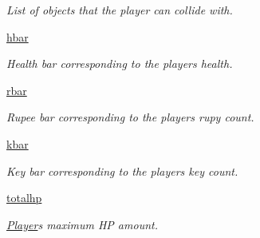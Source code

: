 \begin{DoxyCompactItemize}
\begin{DoxyCompactList}\small\item\em List of objects that the player can collide with. \end{DoxyCompactList}\item 
\mbox{\label{classactor_1_1player_1_1_player_a8678a9b7bbec1f8a257498fdd66597fb}} 
\hyperlink{classactor_1_1player_1_1_player_a8678a9b7bbec1f8a257498fdd66597fb}{hbar}
\begin{DoxyCompactList}\small\item\em Health bar corresponding to the player\textquotesingle{}s health. \end{DoxyCompactList}\item 
\mbox{\label{classactor_1_1player_1_1_player_a31f4d4cef26800b302bb683ab0008851}} 
\hyperlink{classactor_1_1player_1_1_player_a31f4d4cef26800b302bb683ab0008851}{rbar}
\begin{DoxyCompactList}\small\item\em Rupee bar corresponding to the player\textquotesingle{}s rupy count. \end{DoxyCompactList}\item 
\mbox{\label{classactor_1_1player_1_1_player_afa08d9f1172947ccc9eb5e5bae3a7a8e}} 
\hyperlink{classactor_1_1player_1_1_player_afa08d9f1172947ccc9eb5e5bae3a7a8e}{kbar}
\begin{DoxyCompactList}\small\item\em Key bar corresponding to the player\textquotesingle{}s key count. \end{DoxyCompactList}\item 
\mbox{\label{classactor_1_1player_1_1_player_af93fcffe1d5f4b16ad7ca71b54a779d7}} 
\hyperlink{classactor_1_1player_1_1_player_af93fcffe1d5f4b16ad7ca71b54a779d7}{totalhp}
\begin{DoxyCompactList}\small\item\em \hyperlink{classactor_1_1player_1_1_player}{Player}\textquotesingle{}s maximum HP amount. \end{DoxyCompactList}\item 
\mbox{\label{classactor_1_1player_1_1_player_ae153752032a484c8f84d11a3bd4ad922}} 

\end{DoxyCompactItemize}
